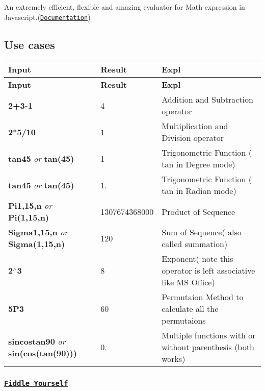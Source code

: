 An extremely efficient, flexible and amazing evaluator for Math expression in Javascript.(\href{http://redhivesoftware.github.io/math-expression-evaluator/}{\tt Documentation})

\subsection*{Use cases}

\tabulinesep=1mm
\begin{longtabu} spread 0pt [c]{*{3}{|X[-1]}|}
\hline
\rowcolor{\tableheadbgcolor}\textbf{ Input  }&\textbf{ Result  }&\textbf{ Expl   }\\
\endfirsthead
\hline
\endfoot
\hline
\rowcolor{\tableheadbgcolor}\textbf{ Input  }&\textbf{ Result  }&\textbf{ Expl   }\\
\endhead
{\bfseries 2+3-\/1}  &4  &Addition and Subtraction operator   \\
{\bfseries 2$\ast$5/10}  &1  &Multiplication and Division operator   \\
{\bfseries tan45} {\itshape or} {\bfseries tan(45)}  &1  &Trigonometric Function ( tan in Degree mode)   \\
{\bfseries tan45} {\itshape or} {\bfseries tan(45)}  &1.  &Trigonometric Function ( tan in Radian mode)   \\
{\bfseries Pi1,15,n} {\itshape or} {\bfseries Pi(1,15,n)}  &1307674368000  &Product of Sequence   \\
{\bfseries Sigma1,15,n} {\itshape or} {\bfseries Sigma(1,15,n)}  &120  &Sum of Sequence( also called summation)   \\
{\bfseries 2$^\wedge$3}  &8  &Exponent( note this operator is left associative like M\+S Office)   \\
{\bfseries 5\+P3}  &60  &Permutaion Method to calculate all the permutaions   \\
{\bfseries sincostan90} {\itshape or} {\bfseries sin(cos(tan(90)))}  &0.  &Multiple functions with or without parenthesis (both works)   \\
\end{longtabu}


\subsubsection*{\href{http://jsbin.com/fuyowu/1/edit?html,output}{\tt Fiddle Yourself}}

